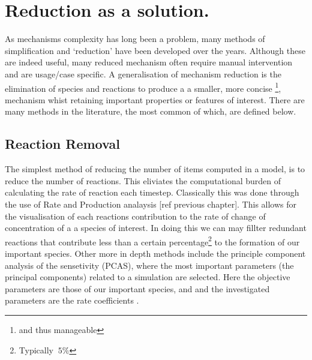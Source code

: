
\section{Reduction as a solution.}

As mechanisms complexity has long been a problem, many methods of simplification and `reduction' have been developed over the years. Although these are indeed useful, many reduced mechanism often require manual intervention and are usage/case specific. A generalisation of mechanism reduction is the elimination of species and reactions to produce a a smaller, more concise \footnote{and thus manageable}, mechanism whist retaining important properties or features of interest. There are many methods in the literature, the most common of which, are defined below. \\


%
%
%



\subsection{Reaction Removal}
The simplest method of reducing the number of items computed in a model, is to reduce the number of reactions. This eliviates the computational burden of calculating the rate of reaction each timestep.
Classically this was done through the use of Rate and Production analaysis [ref previous chapter]. This allows for the visualisation of each reactions contribution to the rate of change of concentration of a a species of interest. In doing this we can may fillter redundant reactions that contribute less than a certain percentage\footnote{Typically $~5\%$} to the formation of our important species. Other more in depth methods include the principle component analysis of the sensetivity (PCAS), where the most important parameters (the principal components) related to a simulation are selected. Here the objective parameters are those of our important species, and and the investigated parameters are the rate coefficients \cite{PCAS}.


